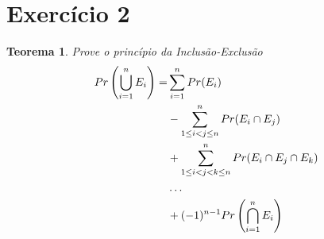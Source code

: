\documentclass{article}
\begin{document}
\section{Exercício 2}
\newtheorem{teo2}{Teorema}
\begin{teo2}
    Prove o princípio da Inclusão-Exclusão
    \begin{equation}
    \notag
        \begin{split}
            Pr\left(\bigcup_{i = 1}^{n}E_i\right) =& \sum\limits_{i=1}^{n}Pr(E_i)\\
            & -\sum\limits_{1\leq i<j\leq n}^{n}Pr(E_i \cap E_j)\\
            & +\sum\limits_{1\leq i<j<k\leq n}^{n}Pr(E_i \cap E_j \cap E_k)\\
            & \ldots\\
            & +(-1)^{n-1}Pr\left(\bigcap_{i=1}^{n}E_i\right)
        \end{split}
    \end{equation}
\end{teo2}
\end{document}
